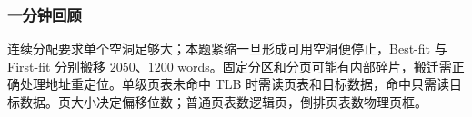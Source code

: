 \subsubsection*{一分钟回顾}

连续分配要求单个空洞足够大；本题紧缩一旦形成可用空洞便停止，Best-fit 与 First-fit 分别搬移 $2050$、$1200$ words。固定分区和分页可能有内部碎片，搬迁需正确处理地址重定位。单级页表未命中 TLB 时需读页表和目标数据，命中只需读目标数据。页大小决定偏移位数；普通页表数逻辑页，倒排页表数物理页框。

